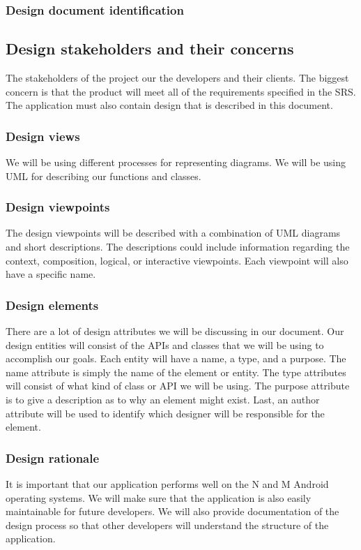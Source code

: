 \documentclass[journal,compsoc, 10pt, draftclsnofoot, onecolumn]{IEEEtran}
\begin{document}
\subsubsection{Design document identification}

\subsection{Design stakeholders and their concerns}
The stakeholders of the project our the developers and their clients. The 
biggest concern is that the product will meet all of the requirements specified 
in the SRS. The application must also contain design that is described in this 
document. 

\subsubsection{Design views}
We will be using different processes for representing diagrams. We will be using
 UML for describing our functions and classes.

\subsubsection{Design viewpoints}
The design viewpoints will be described with a combination of UML diagrams and 
short descriptions. The descriptions could include information regarding the 
context, composition, logical, or interactive viewpoints. Each viewpoint will 
also have a specific name.

\subsubsection{Design elements}
There are a lot of design attributes we will be discussing in our document. Our 
design entities will consist of the APIs and classes that we will be using to 
accomplish our goals. Each entity will have a name, a type, and a purpose. The 
name attribute is simply the name of the element or entity. The type attributes 
will consist of what kind of class or API we will be using. The purpose attribute 
is to give a description as to why an element might exist. Last, an author 
attribute will be used to identify which designer will be responsible for the 
element.

\subsubsection{Design rationale}
It is important that our application performs well on the N and M Android operating 
systems. We will make sure that the application is also easily maintainable 
for future developers. We will also provide documentation of the design process 
so that other developers will understand the structure of the application.
\end{document}
